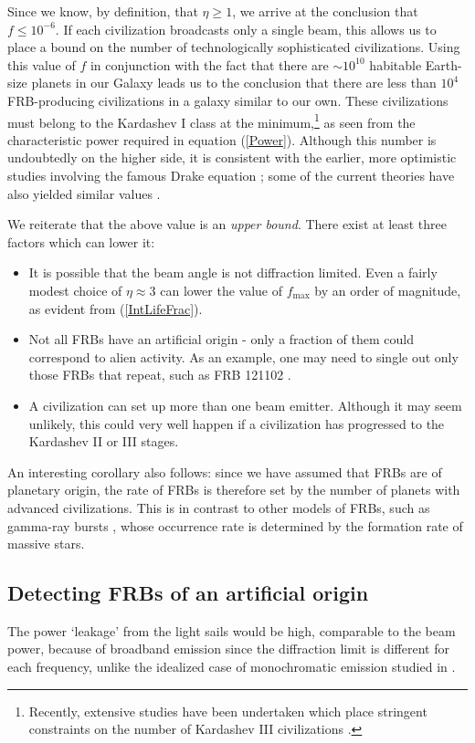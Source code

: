 \documentclass[twocolumn,tighten]{aastex61}
\begin{document}
Since we know, by definition, that $\eta \geq 1$, we arrive at the conclusion that $f \leq 10^{-6}$. If each civilization broadcasts only a single beam, this allows us to place a bound on the number of technologically sophisticated civilizations. Using this value of $f$ in conjunction with the fact that there are $\sim 10^{10}$ habitable Earth-size planets in our Galaxy leads us to the conclusion that there are less than $10^4$ FRB-producing civilizations in a galaxy similar to our own. These civilizations must belong to the Kardashev I class \citep{Kar64} at the minimum,\footnote{Recently, extensive studies have been undertaken which place stringent constraints on the number of Kardashev III civilizations \citep{Wet14,Zet15}.} as seen from the characteristic power required in equation (\ref{Power}). Although this number is undoubtedly on the higher side, it is consistent with the earlier, more optimistic studies involving the famous Drake equation \citep{DS92}; some of the current theories have also yielded similar values \citep{Forg09,Ling16}.

We reiterate that the above value is an \emph{upper bound}. There exist at least three factors which can lower it:
\begin{itemize}
\item It is possible that the beam angle is not diffraction limited. Even a fairly modest choice of $\eta \approx 3$ can lower the value of $f_\mathrm{max}$ by an order of magnitude, as evident from (\ref{IntLifeFrac}). 
\item Not all FRBs have an artificial origin - only a fraction of them could correspond to alien activity. As an example, one may need to single out only those FRBs that repeat, such as FRB 121102 \citep{Mao15,SSH16,Chat17,Tend17}.
\item A civilization can set up more than one beam emitter. Although it may seem unlikely, this could very well happen if a civilization has progressed to the Kardashev II or III stages. 
\end{itemize}

An interesting corollary also follows: since we have assumed that FRBs are of planetary origin, the rate of FRBs is therefore set by the number of planets with advanced civilizations. This is in contrast to other models of FRBs, such as gamma-ray bursts \citep{Zhang14,DeLa16}, whose occurrence rate is determined by the formation rate of massive stars.

\subsection{Detecting FRBs of an artificial origin}
The power `leakage' from the light sails would be high, comparable to the beam power, because of broadband emission since the diffraction limit is different for each frequency, unlike the idealized case of monochromatic emission studied in \citet{GL15}.
\end{document}
